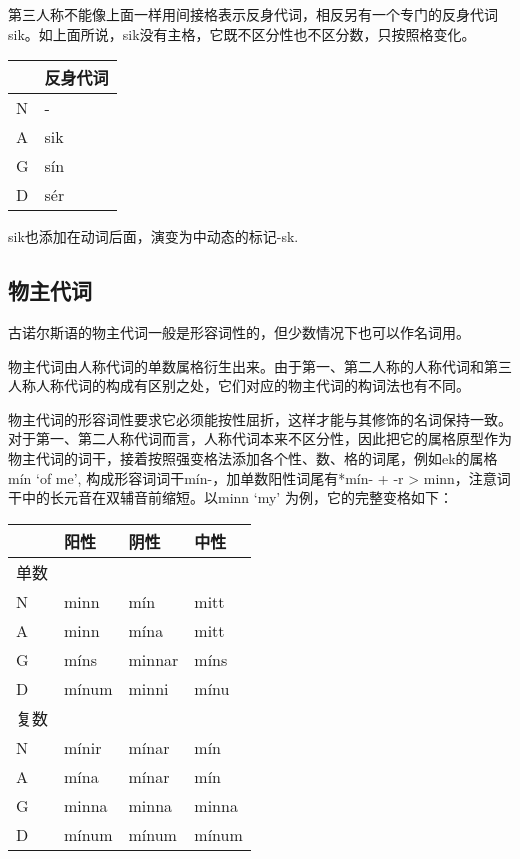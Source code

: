 第三人称不能像上面一样用间接格表示反身代词，相反另有一个专门的反身代词sik。如上面所说，sik没有主格，它既不区分性也不区分数，只按照格变化。

\begin{longtable}{ll}
\toprule
 & 反身代词 \\
\midrule
\endhead
\bottomrule
\endfoot
N & - \\
A & sik \\
G & sín \\
D & sér \\
\end{longtable}

sik也添加在动词后面，演变为中动态的标记-sk.

\subsection{物主代词}\label{ux7269ux4e3bux4ee3ux8bcd}

古诺尔斯语的物主代词一般是形容词性的，但少数情况下也可以作名词用。

物主代词由人称代词的单数属格衍生出来。由于第一、第二人称的人称代词和第三人称人称代词的构成有区别之处，它们对应的物主代词的构词法也有不同。

物主代词的形容词性要求它必须能按性屈折，这样才能与其修饰的名词保持一致。对于第一、第二人称代词而言，人称代词本来不区分性，因此把它的属格原型作为物主代词的词干，接着按照强变格法添加各个性、数、格的词尾，例如ek的属格
mín `of me‌', 构成形容词词干mín-，加单数阳性词尾有*mín- + -r
\textgreater{} minn，注意词干中的长元音在双辅音前缩短。以minn `my‌'
为例，它的完整变格如下：

\begin{longtable}{llll}
\toprule
 & 阳性 & 阴性 & 中性 \\
\midrule
\endhead
\bottomrule
\endfoot
单数 & & & \\
N & minn & mín & mitt \\
A & minn & mína & mitt \\
G & míns & minnar & míns \\
D & mínum & minni & mínu \\
复数 & & & \\
N & mínir & mínar & mín \\
A & mína & mínar & mín \\
G & minna & minna & minna \\
D & mínum & mínum & mínum \\
\end{longtable}

